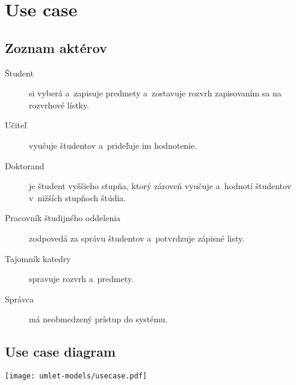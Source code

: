 \section{Use case}

\subsection{Zoznam aktérov}

\begin{description}
    \item[Študent] si vyberá a~zapisuje predmety a~zostavuje rozvrh
    zapisovaním sa na rozvrhové lístky.

    \item[Učiteľ] vyučuje študentov a~prideľuje im hodnotenie.

    \item[Doktorand] je študent vyššieho stupňa, ktorý zároveň vyučuje
    a~hodnotí študentov v~nižších stupňoch štúdia.

    \item[Pracovník študijného oddelenia] zodpovedá za správu študentov
    a~potvrdzuje zápisné listy.

    \item[Tajomník katedry] spravuje rozvrh a~predmety.

    \item[Správca] má neobmedzený prístup do systému.
\end{description}

\subsection{Use case diagram}

\texttt{[image: umlet-models/usecase.pdf]}

